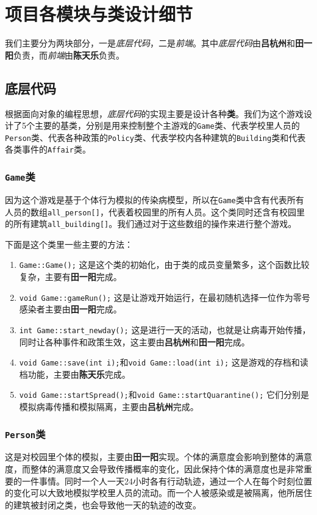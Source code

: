 \documentclass[hyperref,a4paper,UTF8]{ctexart}
\begin{document}
\section{项目各模块与类设计细节}
我们主要分为两块部分，一是\textit{底层代码}，二是\textit{前端}。其中\textit{底层代码}由\textbf{吕杭州}和\textbf{田一阳}负责，而\textit{前端}由\textbf{陈天乐}负责。

\subsection{底层代码}
根据面向对象的编程思想，\textit{底层代码}的实现主要是设计各种\textbf{类}。我们为这个游戏设计了5个主要的基类，分别是用来控制整个主游戏的\texttt{Game}类、代表学校里人员的\texttt{Person}类、代表各种政策的\texttt{Policy}类、代表学校内各种建筑的\texttt{Building}类和代表各类事件的\texttt{Affair}类。
\subsubsection{\texttt{Game}类}
因为这个游戏是基于个体行为模拟的传染病模型，所以在\texttt{Game}类中含有代表所有人员的数组\texttt{all\_person[]}，代表着校园里的所有人员。这个类同时还含有校园里的所有建筑\texttt{all\_building[]}。我们通过对于这些数组的操作来进行整个游戏。

下面是这个类里一些主要的方法：

\begin{enumerate}
    \item \texttt{Game::Game();} 这是这个类的初始化，由于类的成员变量繁多，这个函数比较复杂，主要有\textbf{田一阳}完成。
    \item \texttt{void Game::gameRun();} 这是让游戏开始运行，在最初随机选择一位作为零号感染者主要由\textbf{田一阳}完成。
    \item \texttt{int Game::start\_newday();} 这是进行一天的活动，也就是让病毒开始传播，同时让各种事件和政策生效，这主要由\textbf{吕杭州}和\textbf{田一阳}完成。
    \item \texttt{void Game::save(int i);}和\texttt{void Game::load(int i);} 这是游戏的存档和读档功能，主要由\textbf{陈天乐}完成。
    \item \texttt{void Game::startSpread();}和\texttt{void Game::startQuarantine();} 它们分别是模拟病毒传播和模拟隔离，主要由\textbf{吕杭州}完成。
\end{enumerate}

\subsubsection{\texttt{Person}类}
这是对校园里个体的模拟，主要由\textbf{田一阳}实现。个体的满意度会影响到整体的满意度，而整体的满意度又会导致传播概率的变化，因此保持个体的满意度也是非常重要的一件事情。同时一个人一天24小时各有行动轨迹，通过一个人在每个时刻位置的变化可以大致地模拟学校里人员的流动。而一个人被感染或是被隔离，他所居住的建筑被封闭之类，也会导致他一天的轨迹的改变。
\end{document}
